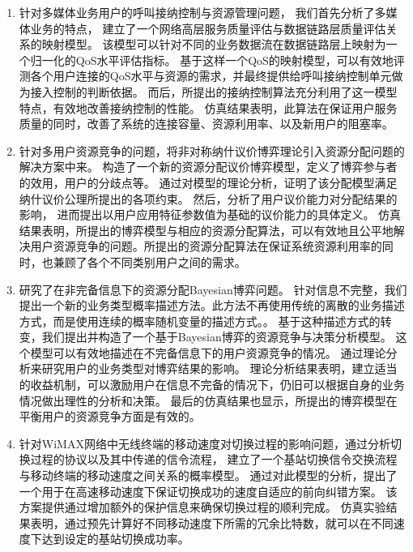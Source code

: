 \begin{enumerate}[(1.)]
\item
针对多媒体业务用户的呼叫接纳控制与资源管理问题，
我们首先分析了多媒体业务的特点，
建立了一个网络高层服务质量评估与数据链路层质量评估关系的映射模型。
该模型可以针对不同的业务数据流在数据链路层上映射为一个归一化的QoS水平评估指标。
基于这样一个QoS的映射模型，可以有效地评测各个用户连接的QoS水平与资源的需求，并最终提供给呼叫接纳控制单元做为接入控制的判断依据。
而后，所提出的接纳控制算法充分利用了这一模型特点，有效地改善接纳控制的性能。
仿真结果表明，此算法在保证用户服务质量的同时，改善了系统的连接容量、资源利用率、以及新用户的阻塞率。
\item 针对多用户资源竞争的问题，将非对称纳什议价博弈理论引入资源分配问题的解决方案中来。
构造了一个新的资源分配议价博弈模型，定义了博弈参与者的效用，用户的分歧点等。
通过对模型的理论分析，证明了该分配模型满足纳什议价公理所提出的各项约束。
然后，分析了用户议价能力对分配结果的影响，
进而提出以用户应用特征参数值为基础的议价能力的具体定义。
仿真结果表明，所提出的博弈模型与相应的资源分配算法，可以有效地且公平地解决用户资源竞争的问题。所提出的资源分配算法在保证系统资源利用率的同时，也兼顾了各个不同类别用户之间的需求。

\item 研究了在非完备信息下的资源分配Bayesian博弈问题。
针对信息不完整，我们提出一个新的业务类型概率描述方法。此方法不再使用传统的离散的业务描述方式，而是使用连续的概率随机变量的描述方式。。
基于这种描述方式的转变，我们提出并构造了一个基于Bayesian博弈的资源竞争与决策分析模型。
这个模型可以有效地描述在不完备信息下的用户资源竞争的情况。
通过理论分析来研究用户的业务类型对博弈结果的影响。
理论分析结果表明，建立适当的收益机制，可以激励用户在信息不完备的情况下，仍旧可以根据自身的业务情况做出理性的分析和决策。
最后的仿真结果也显示，所提出的博弈模型在平衡用户的资源竞争方面是有效的。

\item 针对WiMAX网络中无线终端的移动速度对切换过程的影响问题，通过分析切换过程的协议以及其中传递的信令流程，
建立了一个基站切换信令交换流程与移动终端的移动速度之间关系的概率模型。
通过对此模型的分析，提出了一个用于在高速移动速度下保证切换成功的速度自适应的前向纠错方案。
该方案提供通过增加额外的保护信息来确保切换过程的顺利完成。
仿真实验结果表明，通过预先计算好不同移动速度下所需的冗余比特数，就可以在不同速度下达到设定的基站切换成功率。
\end{enumerate}

